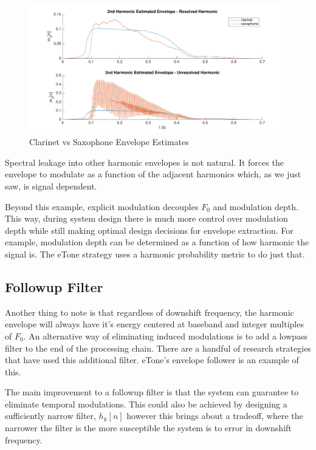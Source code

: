 \documentclass [11pt, proquest,oneside] {ganter_thesis}[2015/03/03]
\begin{document}
\begin{figure}[!ht]
  \centering
    \includegraphics[width=1\textwidth]{matlab/clarinetVSsax_T}   
    \caption{Clarinet vs Saxophone Envelope Estimates}\label{fig:clarinetVSsax_T}
\end{figure}

Spectral leakage into other harmonic envelopes is not natural.  It forces the envelope to modulate as a function of the adjacent harmonics which, as we just saw, is signal dependent.

Beyond this example, explicit modulation decouples $F_0$ and modulation depth.  This way, during system design there is much more control over modulation depth while still making optimal design decisions for envelope extraction.  For example, modulation depth can be determined as a function of how harmonic the signal is.  The eTone strategy \cite{vandali2011development} uses a harmonic probability metric to do just that.

\subsection{Followup Filter}

Another thing to note is that regardless of downshift frequency, the harmonic envelope will always have it's energy centered at baseband and integer multiples of $F_0$.  An alternative way of eliminating induced modulations is to add a lowpass filter to the end of the processing chain.  There are a handful of research strategies that have used this additional filter.  eTone's envelope follower is an example of this.

The main improvement to a followup filter is that the system can guarantee to eliminate temporal modulations.  This could also be achieved by designing a sufficiently narrow filter, $h_k[n]$ however this brings about a tradeoff, where the narrower the filter is the more susceptible the system is to error in downshift frequency.
\end{document}
